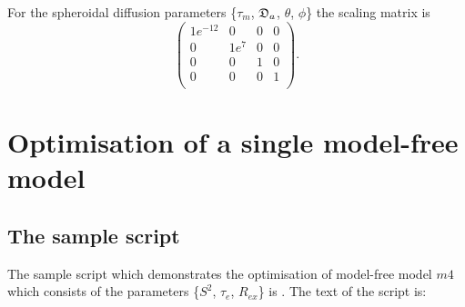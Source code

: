 \begin{htmlonly}
\begin{htmlonly}
\noindent  For the spheroidal diffusion parameters \{$\tau_m$, $\mathfrak{D}_a$, $\theta$, $\phi$\} the scaling matrix is
\begin{equation}
    \begin{pmatrix}
        1e^{-12} &  0 &  0 &  0 \\
        0 &  1e^7 &  0 &  0 \\
        0 &  0 &  1 &  0 \\
        0 &  0 &  0 &  1 \\
    \end{pmatrix}.
\end{equation}





\section{Optimisation of a single model-free model}\label{sect: single mf model}



\subsection{The sample script}

The sample script which demonstrates the optimisation of model-free model $m4$ which consists of the parameters \{$S^2$, $\tau_e$, $R_{ex}$\} is .  The text of the script is:


\end{htmlonly}
\end{htmlonly}
